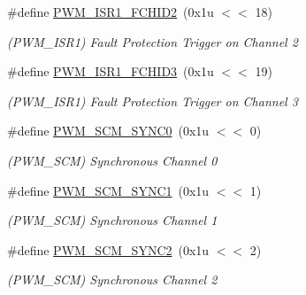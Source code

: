 \begin{DoxyCompactItemize}
\#define \mbox{\hyperlink{group__SAME70__PWM_gaff4258f3fafae81aa9d871e8bf9d656e}{P\+W\+M\+\_\+\+I\+S\+R1\+\_\+\+F\+C\+H\+I\+D2}}~(0x1u $<$$<$ 18)
\begin{DoxyCompactList}\small\item\em (P\+W\+M\+\_\+\+I\+S\+R1) Fault Protection Trigger on Channel 2 \end{DoxyCompactList}\item 
\mbox{\label{group__SAME70__PWM_gad44b49b584c2c3f42c4b3ca78d9e86bf}} 
\#define \mbox{\hyperlink{group__SAME70__PWM_gad44b49b584c2c3f42c4b3ca78d9e86bf}{P\+W\+M\+\_\+\+I\+S\+R1\+\_\+\+F\+C\+H\+I\+D3}}~(0x1u $<$$<$ 19)
\begin{DoxyCompactList}\small\item\em (P\+W\+M\+\_\+\+I\+S\+R1) Fault Protection Trigger on Channel 3 \end{DoxyCompactList}\item 
\mbox{\label{group__SAME70__PWM_gaba5a800dc0108c6efdf60e6e87946071}} 
\#define \mbox{\hyperlink{group__SAME70__PWM_gaba5a800dc0108c6efdf60e6e87946071}{P\+W\+M\+\_\+\+S\+C\+M\+\_\+\+S\+Y\+N\+C0}}~(0x1u $<$$<$ 0)
\begin{DoxyCompactList}\small\item\em (P\+W\+M\+\_\+\+S\+CM) Synchronous Channel 0 \end{DoxyCompactList}\item 
\mbox{\label{group__SAME70__PWM_ga8238b59e1eedc70791a3c2ac21b6198c}} 
\#define \mbox{\hyperlink{group__SAME70__PWM_ga8238b59e1eedc70791a3c2ac21b6198c}{P\+W\+M\+\_\+\+S\+C\+M\+\_\+\+S\+Y\+N\+C1}}~(0x1u $<$$<$ 1)
\begin{DoxyCompactList}\small\item\em (P\+W\+M\+\_\+\+S\+CM) Synchronous Channel 1 \end{DoxyCompactList}\item 
\mbox{\label{group__SAME70__PWM_ga10d1db9baeea99e727a31c8968e3a5f7}} 
\#define \mbox{\hyperlink{group__SAME70__PWM_ga10d1db9baeea99e727a31c8968e3a5f7}{P\+W\+M\+\_\+\+S\+C\+M\+\_\+\+S\+Y\+N\+C2}}~(0x1u $<$$<$ 2)
\begin{DoxyCompactList}\small\item\em (P\+W\+M\+\_\+\+S\+CM) Synchronous Channel 2 \end{DoxyCompactList}\item 
$$
\end{DoxyCompactItemize}
